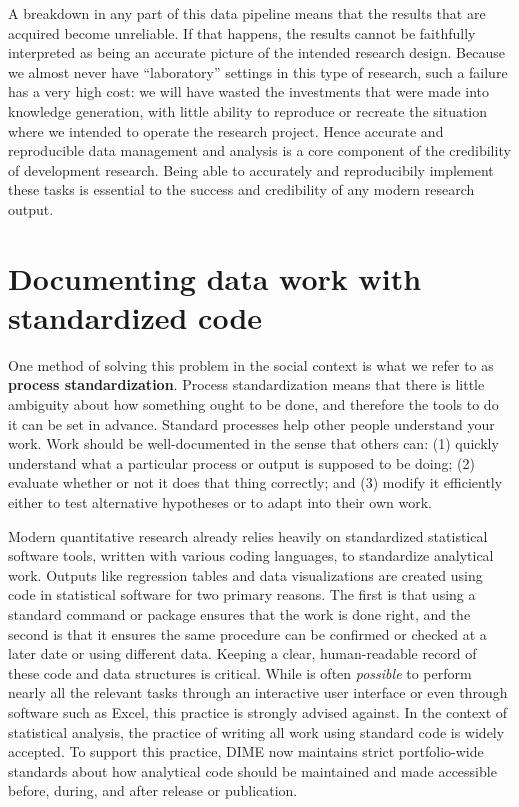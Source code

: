 A breakdown in any part of this data pipeline
means that the results that are acquired become unreliable.\cite{mccullough2008economics}
If that happens, the results cannot be faithfully interpreted
as being an accurate picture of the intended research design.
Because we almost never have ``laboratory'' settings in this type of research,
such a failure has a very high cost:
we will have wasted the investments that were made into knowledge generation,
with little ability to reproduce or recreate the situation
where we intended to operate the research project.\cite{camerer2016evaluating}
Hence accurate and reproducible data management and analysis is a core component
of the credibility of development research.
Being able to accurately and reproducibily implement these tasks
is essential to the success and credibility of any modern research output.


\section{Documenting data work with standardized code}

One method of solving this problem in the social context
is what we refer to as \textbf{process standardization}.
Process standardization means that there is
little ambiguity about how something ought to be done,
and therefore the tools to do it can be set in advance.
Standard processes help other people understand your work.
Work should be well-documented in the sense that others can:
(1) quickly understand what a particular process or output is supposed to be doing;
(2) evaluate whether or not it does that thing correctly; and
(3) modify it efficiently either to test alternative hypotheses
or to adapt into their own work.

Modern quantitative research already relies heavily
on standardized statistical software tools,
written with various coding languages, to standardize analytical work.
Outputs like regression tables and data visualizations
are created using code in statistical software for two primary reasons.
The first is that using a standard command or package ensures that the work is done right,
and the second is that it ensures the same procedure can be confirmed or checked
at a later date or using different data.
Keeping a clear, human-readable record of these code and data structures is critical.
While is often \textit{possible} to perform nearly all the relevant tasks
through an interactive user interface or even through software such as Excel,
this practice is strongly advised against.
In the context of statistical analysis,
the practice of writing all work using standard code is widely accepted.
To support this practice, DIME now maintains strict portfolio-wide standards
about how analytical code should be maintained and made accessible
before, during, and after release or publication.

